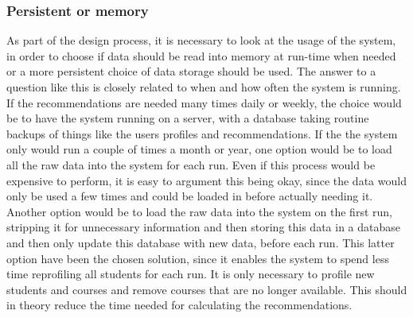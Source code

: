 \subsubsection{Persistent or memory}
\label{subsec:persistent}
As part of the design process, it is necessary to look at the usage of the system, in order to choose if data should be read into memory at run-time when needed or a more persistent choice of data storage should be used. The answer to a question like this is closely related to when and how often the system is running. If the recommendations are needed many times daily or weekly, the choice would be to have the system running on a server, with a database taking routine backups of things like the users profiles and recommendations. If the the system only would run a couple of times a month or year, one option would be to load all the raw data into the system for each run. Even if this process would be expensive to perform, it is easy to argument this being okay, since the data would only be used a few times and could be loaded in before actually needing it. Another option would be to load the raw data into the system on the first run, stripping it for unnecessary information and then storing this data in a database and then only update this database with new data, before each run. This latter option have been the chosen solution, since it enables the system to spend less time reprofiling all students for each run. It is only necessary to profile new students and courses and remove courses that are no longer available. This should in theory reduce the time needed for calculating the recommendations.





